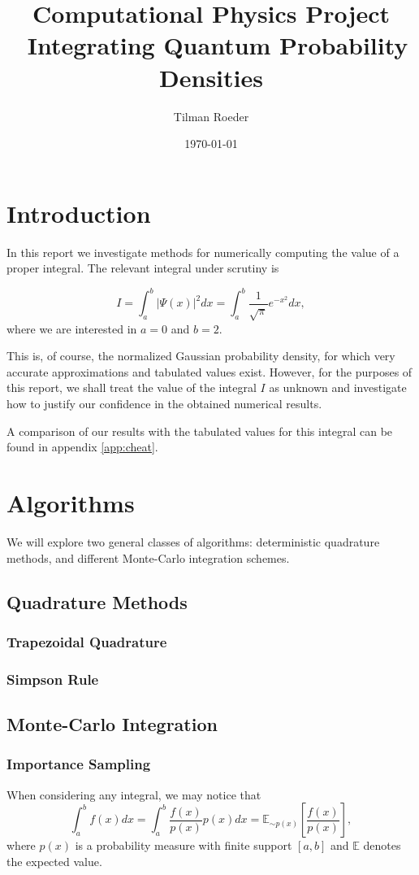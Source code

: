 \documentclass[10pt, a4paper]{article}
\title{Computational Physics Project \\ Integrating Quantum Probability Densities}
\author{Tilman Roeder}
\date{\today}
\begin{document}
\maketitle

\section{Introduction}
In this report we investigate methods for numerically computing the value of a proper integral.
The relevant integral under scrutiny is

\begin{equation}
\label{eq:target}
I = \int_a^b |\Psi(x)|^2 dx = \int_a^b \frac{1}{\sqrt{\pi}} e^{-x^2} dx,
\end{equation}
where we are interested in $a = 0$ and $b = 2$.

This is, of course, the normalized Gaussian probability density, for which
very accurate approximations and tabulated values exist. However, for the purposes of this report, we shall
treat the value of the integral $I$ as unknown and investigate how to justify our confidence in the
obtained numerical results.

A comparison of our results with the tabulated values for this integral can be found in appendix
\ref{app:cheat}.

\section{Algorithms}
We will explore two general classes of algorithms: deterministic quadrature methods, and different
Monte-Carlo integration schemes.

\subsection{Quadrature Methods}
  \subsubsection{Trapezoidal Quadrature}

  \subsubsection{Simpson Rule}

\subsection{Monte-Carlo Integration}
  \subsubsection{Importance Sampling}
  When considering any integral, we may notice that
  \begin{equation}
  \int_a^b f(x) dx = \int_{a}^{b} \frac{f(x)}{p(x)} p(x) dx = \mathbb{E}_{\sim p(x)}\left[ \frac{f(x)}{p(x)} \right],
  \end{equation}
  where $p(x)$ is a probability measure with finite support $[a, b]$ and $\mathbb{E}$ denotes the expected
  value.
\end{document}
